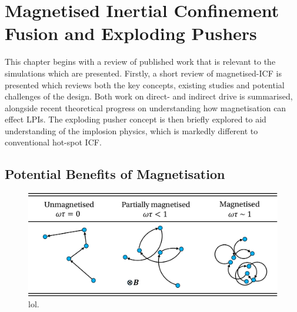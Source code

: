 \newpage

\section{Magnetised Inertial Confinement Fusion and Exploding Pushers}%
\label{sec:Res2_MagICF}

This chapter begins with a review of published work that is relevant to the simulations which are presented.
Firstly, a short review of magnetised-\ac{ICF} is presented which reviews both the key concepts, existing studies and potential challenges of the design.
Both work on direct- and indirect drive is summarised, alongside recent theoretical progress on understanding how magnetisation can effect \ac{LPIs}.
The exploding pusher concept is then briefly explored to aid understanding of the implosion physics, which is markedly different to conventional hot-spot \ac{ICF}.

\subsection{Potential Benefits of Magnetisation}%
\label{sec:Res2_magbenefits}


\begin{figure}[t!]
    \includegraphics[width=0.75\linewidth]{Results2/Images/wt_collisions.png}
    \centering
    \caption{lol.}%
    \label{fig:Res2_Bose_magp2}
\end{figure}

